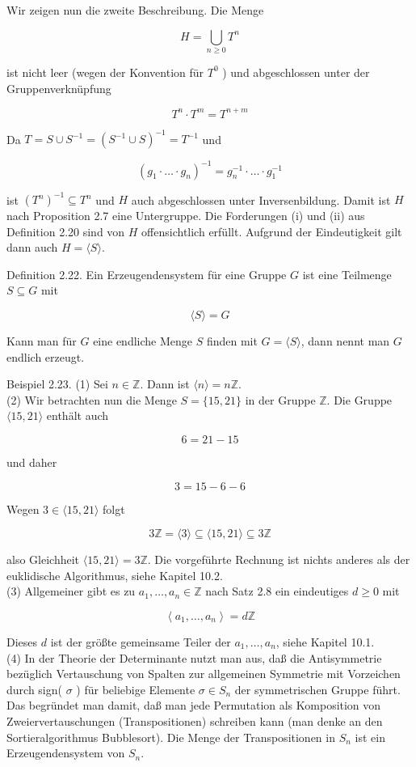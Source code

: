 \documentclass[10pt, letterpaper]{article}
\begin{document}
Wir zeigen nun die zweite Beschreibung. Die Menge

$$
H=\bigcup_{n \geq 0} T^{n}
$$

ist nicht leer (wegen der Konvention für $T^{0}$ ) und abgeschlossen unter der Gruppenverknüpfung

$$
T^{n} \cdot T^{m}=T^{n+m}
$$

Da $T=S \cup S^{-1}=\left(S^{-1} \cup S\right)^{-1}=T^{-1}$ und

$$
\left(g_{1} \cdot \ldots \cdot g_{n}\right)^{-1}=g_{n}^{-1} \cdot \ldots \cdot g_{1}^{-1}
$$

ist $\left(T^{n}\right)^{-1} \subseteq T^{n}$ und $H$ auch abgeschlossen unter Inversenbildung. Damit ist $H$ nach Proposition 2.7 eine Untergruppe. Die Forderungen (i) und (ii) aus Definition 2.20 sind von $H$ offensichtlich erfüllt. Aufgrund der Eindeutigkeit gilt dann auch $H=\langle S\rangle$.

Definition 2.22. Ein Erzeugendensystem für eine Gruppe $G$ ist eine Teilmenge $S \subseteq G$ mit

$$
\langle S\rangle=G
$$

Kann man für $G$ eine endliche Menge $S$ finden mit $G=\langle S\rangle$, dann nennt man $G$ endlich erzeugt.

Beispiel 2.23. (1) Sei $n \in \mathbb{Z}$. Dann ist $\langle n\rangle=n \mathbb{Z}$.\\
(2) Wir betrachten nun die Menge $S=\{15,21\}$ in der Gruppe $\mathbb{Z}$. Die Gruppe $\langle 15,21\rangle$ enthält auch

$$
6=21-15
$$

und daher

$$
3=15-6-6
$$

Wegen $3 \in\langle 15,21\rangle$ folgt

$$
3 \mathbb{Z}=\langle 3\rangle \subseteq\langle 15,21\rangle \subseteq 3 \mathbb{Z}
$$

also Gleichheit $\langle 15,21\rangle=3 \mathbb{Z}$. Die vorgeführte Rechnung ist nichts anderes als der euklidische Algorithmus, siehe Kapitel 10.2.\\
(3) Allgemeiner gibt es zu $a_{1}, \ldots, a_{n} \in \mathbb{Z}$ nach Satz 2.8 ein eindeutiges $d \geq 0$ mit

$$
\left\langle a_{1}, \ldots, a_{n}\right\rangle=d \mathbb{Z}
$$

Dieses $d$ ist der größte gemeinsame Teiler der $a_{1}, \ldots, a_{n}$, siehe Kapitel 10.1.\\
(4) In der Theorie der Determinante nutzt man aus, daß die Antisymmetrie bezüglich Vertauschung von Spalten zur allgemeinen Symmetrie mit Vorzeichen durch sign( $\sigma$ ) für beliebige Elemente $\sigma \in S_{n}$ der symmetrischen Gruppe führt. Das begründet man damit, daß man jede Permutation als Komposition von Zweiervertauschungen (Transpositionen) schreiben kann (man denke an den Sortieralgorithmus Bubblesort). Die Menge der Transpositionen in $S_{n}$ ist ein Erzeugendensystem von $S_{n}$.
\end{document}
